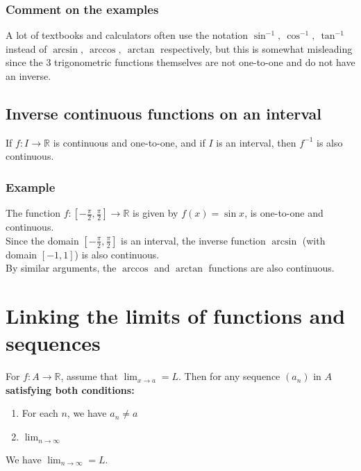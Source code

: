 \documentclass[11pt]{article}
\begin{document}
\subsubsection{Comment on the examples}
\label{sec:org61cf87c}
A lot of textbooks and calculators often use the notation \(\sin^{-1}, \ \cos^{-1}, \ \tan^{-1}\) instead of \(\arcsin, \ \arccos, \ \arctan\) respectively, but this is somewhat misleading since the 3 trigonometric functions themselves are not one-to-one and do not have an inverse.

\subsection{Inverse continuous functions on an interval}
\label{sec:orga112095}
If \(f : I \rightarrow \mathbb{R}\) is continuous and one-to-one, and if \(I\) is an interval, then \(f^{-1}\) is also continuous.

\subsubsection{Example}
\label{sec:org4d77e95}
The function \(f : [-\frac{\pi}{2}, \frac{\pi}{2}] \rightarrow \mathbb{R}\) is given by \(f(x) = \sin x\), is one-to-one and continuous.
\\[0pt]

Since the domain \([-\frac{\pi}{2}, \frac{\pi}{2}]\) is an interval, the inverse function \(\arcsin\) (with domain \([-1, 1]\)) is also continuous.
\\[0pt]

By similar arguments, the \(\arccos\) and \(\arctan\) functions are also continuous.

\newpage


\section{Linking the limits of functions and sequences}
\label{sec:org2c00bcb}
For \(f : A \rightarrow \mathbb{R}\), assume that \(\lim_{x \rightarrow a} = L\). Then for any sequence \((a_n)\) in \(A\) \textbf{satisfying both conditions:}
\begin{enumerate}
\item For each \(n\), we have \(a_n \neq a\)
\item \(\lim_{n \rightarrow \infty}\)
\end{enumerate}

We have \(\lim_{n \rightarrow \infty} = L\).
\end{document}

